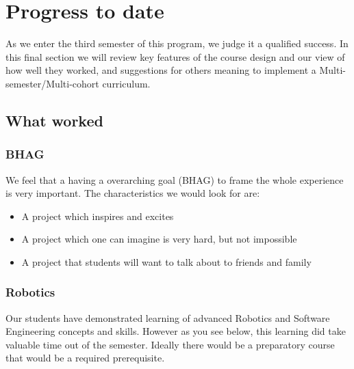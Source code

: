 \section{Progress to date}
As we enter the third semester of this program, we judge it a qualified success. In this final section we will review key features of the course design and our view of how well they worked, and suggestions for others meaning to implement a Multi-semester/Multi-cohort curriculum.
\subsection{What worked}
\subsubsection{BHAG}
We feel that a having a overarching goal (BHAG) to frame the whole experience is very important. The characteristics we would look for are:
\begin{itemize}
\item A project which inspires and excites
\item A project which one can imagine is very hard, but not impossible
\item A project that students will want to talk about to friends and family
\end{itemize}

\subsubsection{Robotics} Our students have demonstrated learning of advanced Robotics and Software Engineering concepts and skills. However as you see below, this learning did take valuable time out of the semester. Ideally there would be a preparatory course that would be a required prerequisite.
